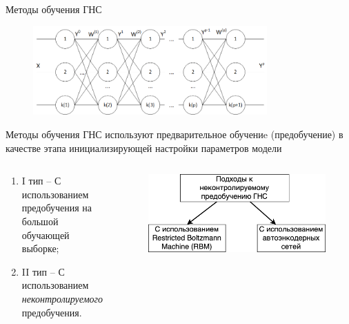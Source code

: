 \documentclass[10pt]{beamer}
\begin{document}
        \begin{frame}{Методы обучения ГНС}
            \begin{figure}[H]
                  \centering
                  \includegraphics[width=0.8\textwidth]{pic1-1.png}
            \end{figure}
            Методы обучения ГНС используют предварительное обучениe (предобучение) в качестве этапа инициализирующей настройки параметров модели
            \begin{columns}
                \begin{column}{0.55\textwidth}
                    \begin{enumerate}
                        \item I тип -- С использованием предобучения на большой обучающей выборке;
                        \item II тип -- С использованием \textit{неконтролируемого} предобучения.
                    \end{enumerate}
                \end{column}
                \begin{column}{0.45\textwidth}
                    \begin{figure}[H]
                        \centering
                        \includegraphics[width=1\textwidth]{pretrain_approaches.png}
                    \end{figure}
                \end{column}
            \end{columns}
        \end{frame}
\end{document}
